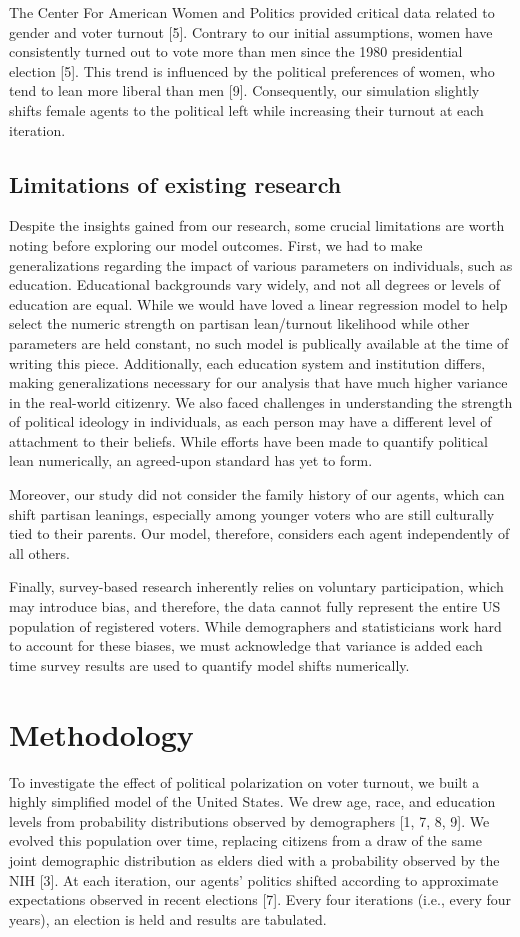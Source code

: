 \documentclass[titlepage, 12pt, leqno]{article} %
\begin{document}
The Center For American Women and Politics provided critical data related to
gender and voter turnout [5]. Contrary to our initial assumptions, women have
consistently turned out to vote more than men since the 1980 presidential
election [5]. This trend is influenced by the political preferences of women,
who tend to lean more liberal than men [9]. Consequently, our simulation 
slightly shifts female agents to the political left while increasing their
turnout at each iteration.

\subsection{Limitations of existing research}
Despite the insights gained from our research, some crucial limitations are 
worth noting before exploring our model outcomes. First, we had to make
generalizations regarding the impact of various parameters on individuals, such
as education. Educational backgrounds vary widely, and not all degrees or levels
of education are equal. While we would have loved a linear regression model to
help select the numeric strength on partisan lean/turnout likelihood while other
parameters are held constant, no such model is publically available at the time
of writing this piece. Additionally, each education system and institution
differs, making generalizations necessary for our analysis that have much higher
variance in the real-world citizenry. We also faced challenges in understanding
the strength of political ideology in individuals, as each person may have a
different level of attachment to their beliefs. While efforts have been made to
quantify political lean numerically, an agreed-upon standard has yet to form. 

Moreover, our study did not consider the family history of our agents, which can
shift partisan leanings, especially among younger voters who are still 
culturally tied to their parents. Our model, therefore, considers each agent
independently of all others. 

Finally, survey-based research inherently relies on voluntary participation,
which may introduce bias, and therefore, the data cannot fully represent the
entire US population of registered voters. While demographers and statisticians
work hard to account for these biases, we must acknowledge that variance is 
added each time survey results are used to quantify model shifts numerically. 
\pagebreak

\section{Methodology}
To investigate the effect of political polarization on voter turnout, we built
a highly simplified model of the United States. We drew age, race, and 
education levels from probability distributions observed by demographers 
[1, 7, 8, 9]. We evolved this population over time, replacing citizens from a
draw of the same joint demographic distribution as elders died with a 
probability observed by the NIH [3]. At each iteration, our agents' politics
shifted according to approximate expectations observed in recent elections [7].
Every four iterations (i.e., every four years), an election is held and results
are tabulated.
\end{document}
